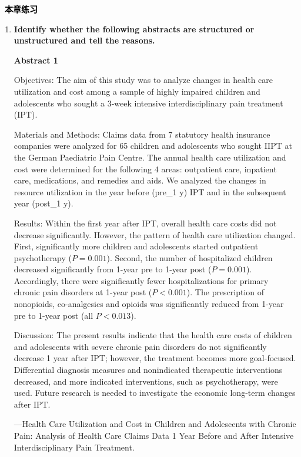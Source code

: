 \documentclass[a4paper]{ctexbook}
\newenvironment{problemset}[1][本章练习]{
  \begin{center}
    \phantomsection\addcontentsline{toc}{section}{\texorpdfstring{本章练习}{Exercice}}
    \markright{#1}
    \textcolor{black}{\Large\bfseries\adftripleflourishleft~#1~\adftripleflourishright}
  \end{center}
  \begin{enumerate}}{
  \end{enumerate}}
\begin{document}
  \begin{problemset}
    \item \textbf{Identify whether the following abstracts are structured or unstructured and tell the reasons.}
    
    \textbf{Abstract 1}

    \hspace*{2em}Objectives: The aim of this study was to analyze changes in health care utilization and cost among a sample of highly impaired children and adolescents who sought a 3-week intensive interdisciplinary pain treatment (IPT).

    \hspace*{2em}Materials and Methods: Claims data from 7 statutory health insurance companies were analyzed for 65 children and adolescents who sought IIPT at the German Paediatric Pain Centre. The annual health care utilization and cost were determined for the following 4 areas: outpatient care, inpatient care, medications, and remedies and aids. We analyzed the changes in resource utilization in the year before (pre\_1 y) IPT and in the subsequent year (post\_1 y).
    
    \hspace*{2em}Results: Within the first year after IPT, overall health care costs did not decrease significantly. However, the pattern of health care utilization changed. First, significantly more children and adolescents started outpatient psychotherapy ($P=0.001$). Second, the number of hospitalized children decreased significantly from 1-year pre to 1-year post ($P=0.001$). Accordingly, there were significantly fewer hospitalizations for primary chronic pain disorders at 1-year post ($P<0.001$). The prescription of nonopioids, co-analgesics and opioids was significantly reduced from 1-year pre to 1-year post (all $P<0. 013$).
    
    \hspace*{2em}Discussion: The present results indicate that the health care costs of children and adolescents with severe chronic pain disorders do not significantly decrease 1 year after IPT; however, the treatment becomes more goal-focused. Differential diagnosis measures and nonindicated therapeutic interventions decreased, and more indicated interventions, such as psychotherapy, were used. Future research is needed to investigate the economic long-term changes after IPT.
    
    \begin{flushright}
      ---Health Care Utilization and Cost in Children and Adolescents with Chronic Pain: Analysis of Health Care Claims Data 1 Year Before and After Intensive Interdisciplinary Pain Treatment. 
      

\end{flushright}
\end{problemset}
\end{document}
